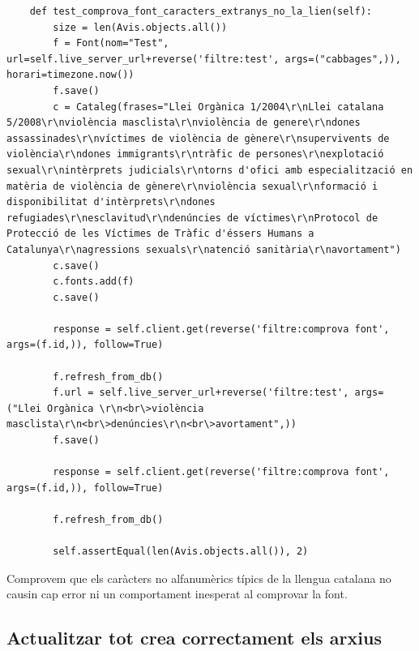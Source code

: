 \documentclass{article}
\begin{document}
\begin{lstlisting}
    def test_comprova_font_caracters_extranys_no_la_lien(self):
        size = len(Avis.objects.all())
        f = Font(nom="Test", url=self.live_server_url+reverse('filtre:test', args=("cabbages",)), horari=timezone.now())
        f.save()
        c = Cataleg(frases="Llei Orgànica 1/2004\r\nLlei catalana 5/2008\r\nviolència masclista\r\nviolència de genere\r\ndones assassinades\r\nvíctimes de violència de gènere\r\nsupervivents de violència\r\ndones immigrants\r\ntràfic de persones\r\nexplotació sexual\r\nintèrprets judicials\r\ntorns d'ofici amb especialització en matèria de violència de gènere\r\nviolència sexual\r\nformació i disponibilitat d'intèrprets\r\ndones refugiades\r\nesclavitud\r\ndenúncies de víctimes\r\nProtocol de Protecció de les Víctimes de Tràfic d'éssers Humans a Catalunya\r\nagressions sexuals\r\natenció sanitària\r\navortament")
        c.save()
        c.fonts.add(f)
        c.save()

        response = self.client.get(reverse('filtre:comprova font', args=(f.id,)), follow=True)

        f.refresh_from_db()
        f.url = self.live_server_url+reverse('filtre:test', args=("Llei Orgànica \r\n<br\>violència masclista\r\n<br\>denúncies\r\n<br\>avortament",))
        f.save()

        response = self.client.get(reverse('filtre:comprova font', args=(f.id,)), follow=True)

        f.refresh_from_db()

        self.assertEqual(len(Avis.objects.all()), 2)
\end{lstlisting}

Comprovem que els caràcters no alfanumèrics típics de la llengua catalana no causin cap error ni un comportament inesperat al comprovar la font.

\subsection{Actualitzar tot crea correctament els arxius}
\end{document}
